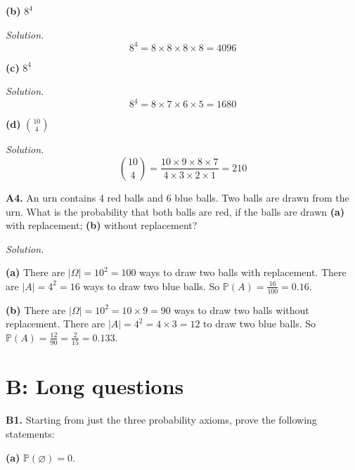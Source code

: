 \documentclass[
  a4paper,
]{book}
\theoremstyle{definition}
\theoremstyle{definition}
\theoremstyle{definition}
\theoremstyle{definition}
\theoremstyle{remark}
\begin{document}
\textbf{(b)} \(8^4\)

\begin{myanswers}
\emph{Solution.}
\[ 8^4 = 8 \times 8 \times 8 \times 8 = 4096 \]

\end{myanswers}

\textbf{(c)} \({8}^{\underline{4}}\)

\begin{myanswers}
\emph{Solution.}
\[ {8}^{\underline{4}} = 8 \times 7 \times 6 \times 5 = 1680 \]

\end{myanswers}

\textbf{(d)} \({\displaystyle \binom{10}{4}}\)

\begin{myanswers}
\emph{Solution.}
\[ \binom{10}{4} = \frac{10 \times 9 \times 8 \times 7}{4\times 3\times 2\times 1} = 210 \]

\end{myanswers}

\textbf{A4.} An urn contains 4 red balls and 6 blue balls. Two balls are drawn from the urn. What is the probability that both balls are red, if the balls are drawn \textbf{(a)} with replacement; \textbf{(b)} without replacement?

\begin{myanswers}
\emph{Solution.}

\textbf{(a)} There are \(|\Omega| = 10^2 = 100\) ways to draw two balls with replacement. There are \(|A| = 4^2=16\) ways to draw two blue balls. So
\(\mathbb P(A) = \frac{16}{100} = 0.16\).

\textbf{(b)} There are \(|\Omega| = {10}^{\underline{2}} = 10 \times 9 = 90\) ways to draw two balls without replacement. There are \(|A| = {4}^{\underline{2}} = 4 \times 3 = 12\) to draw two blue balls. So
\(\mathbb P(A) = \frac{12}{90} = \frac{2}{15} = 0.133\).

\end{myanswers}

\hypertarget{P2-long}{%
\section*{B: Long questions}\label{P2-long}}

\textbf{B1.} Starting from just the three probability axioms, prove the following statements:

\textbf{(a)} \(\mathbb P(\varnothing) = 0\).
\end{document}
